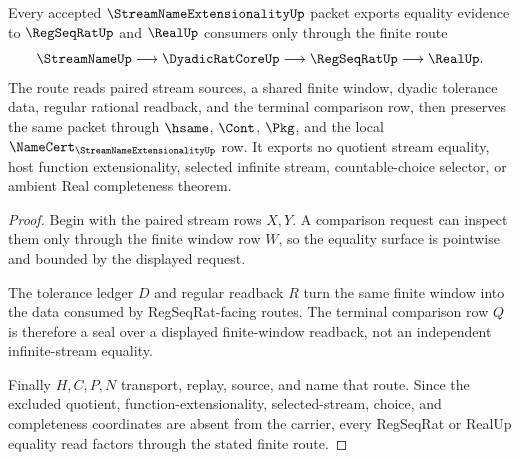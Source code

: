 \begin{theorem}
\label{thm:streamname-extensionality-seal-route}
Every accepted $\StreamNameExtensionalityUp$ packet exports equality evidence to $\RegSeqRatUp$ and $\RealUp$ consumers only through the finite route
$$
\StreamNameUp \longrightarrow \DyadicRatCoreUp \longrightarrow \RegSeqRatUp \longrightarrow \RealUp .
$$
The route reads paired stream sources, a shared finite window, dyadic tolerance data, regular rational readback, and the terminal comparison row, then preserves the same packet through $\hsame$, $\Cont$, $\Pkg$, and the local $\NameCert_{\StreamNameExtensionalityUp}$ row. It exports no quotient stream equality, host function extensionality, selected infinite stream, countable-choice selector, or ambient Real completeness theorem.
\end{theorem}
\begin{proof}
Begin with the paired stream rows $X,Y$. A comparison request can inspect them only through the finite window row $W$, so the equality surface is pointwise and bounded by the displayed request.

The tolerance ledger $D$ and regular readback $R$ turn the same finite window into the data consumed by RegSeqRat-facing routes. The terminal comparison row $Q$ is therefore a seal over a displayed finite-window readback, not an independent infinite-stream equality.

Finally $H,C,P,N$ transport, replay, source, and name that route. Since the excluded quotient, function-extensionality, selected-stream, choice, and completeness coordinates are absent from the carrier, every RegSeqRat or RealUp equality read factors through the stated finite route.
\end{proof}

